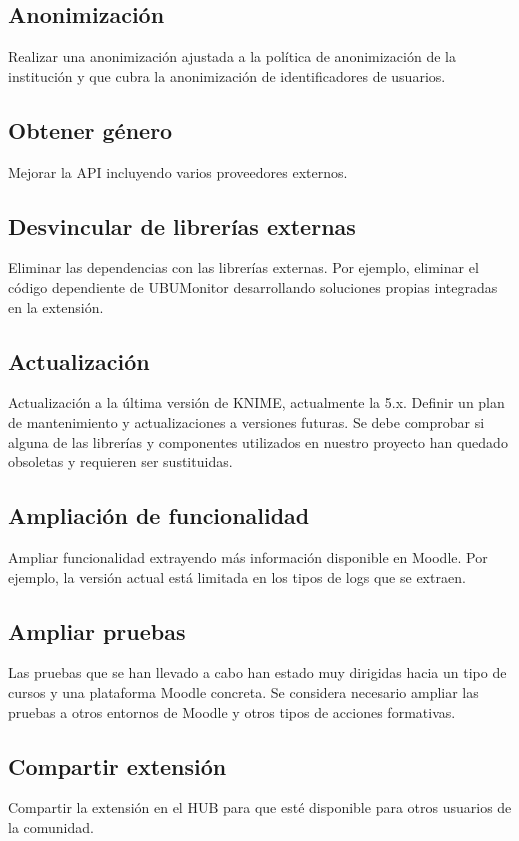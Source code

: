\subsection{Anonimización}

Realizar una anonimización ajustada a la política de anonimización de la institución y que cubra la anonimización de identificadores de usuarios. 


\subsection{Obtener género}

Mejorar la API incluyendo varios proveedores externos. 


\subsection{Desvincular de librerías externas}

Eliminar las dependencias con las librerías externas. Por ejemplo, eliminar el código dependiente de UBUMonitor desarrollando soluciones propias integradas en la extensión. 

\subsection{Actualización}

Actualización a la última versión de KNIME, actualmente la 5.x. Definir un plan de mantenimiento y actualizaciones a versiones futuras. Se debe comprobar 
si alguna de las librerías y componentes utilizados en nuestro proyecto han quedado obsoletas y requieren ser sustituidas. 


\subsection{Ampliación de funcionalidad}

Ampliar funcionalidad extrayendo más información disponible en Moodle. Por ejemplo, la versión actual está limitada en los tipos de logs que se extraen. 


\subsection{Ampliar pruebas}

Las pruebas que se han llevado a cabo han estado muy dirigidas hacia un tipo de cursos y una plataforma Moodle concreta. Se considera necesario 
ampliar las pruebas a otros entornos de Moodle y otros tipos de acciones formativas. 


\subsection{Compartir extensión}

Compartir la extensión en el  HUB para que esté disponible para otros usuarios de la comunidad. 


